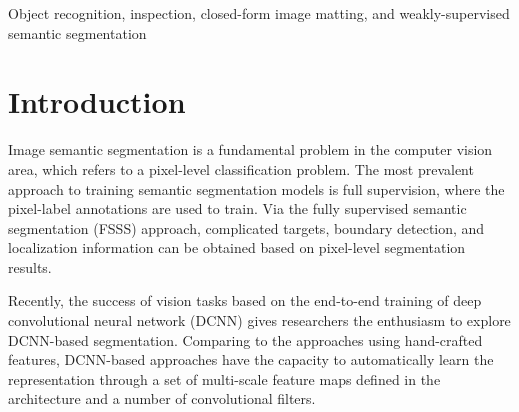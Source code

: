 \documentclass[journal]{IEEEtran}
\begin{document}
\begin{IEEEkeywords}
Object recognition, inspection, closed-form image matting, and weakly-supervised semantic segmentation
\end{IEEEkeywords}
%
\IEEEpeerreviewmaketitle


\section{Introduction}
\label{intro}
Image semantic segmentation is a fundamental problem in the computer vision area, which refers to a pixel-level classification problem. The most prevalent approach to training semantic segmentation models is full supervision, where the pixel-label annotations are used to train. Via the fully supervised semantic segmentation (FSSS) approach, complicated targets, boundary detection, and localization information can be obtained based on pixel-level segmentation results. 

Recently, the success of vision tasks based on the end-to-end training of deep convolutional neural network (DCNN) gives researchers the enthusiasm to explore DCNN-based segmentation. Comparing to the approaches using hand-crafted features, DCNN-based approaches have the capacity to automatically learn the representation through a set of multi-scale feature maps defined in the architecture and a number of convolutional filters. 
\end{document}
